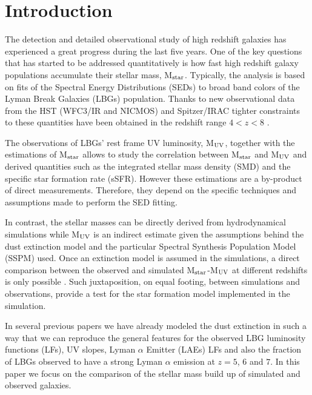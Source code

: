 \documentclass{emulateapj}
\begin{document}
\section{Introduction}



The detection and detailed observational study of high redshift galaxies has
experienced a great progress during the last five years. One of the key
questions that has started to be addressed quantitatively is how fast
high redshift galaxy populations accumulate their stellar mass,
M$_{\rm star}$. Typically, the analysis is based on fits of the  Spectral Energy
Distributions (SEDs) to broad band colors of the Lyman Break Galaxies
(LBGs) population. Thanks to new observational data from the HST (WFC3/IR
and NICMOS) and Spitzer/IRAC tighter constraints to these quantities have been obtained in the
redshift range $4<z<8$ \citep{2009ApJ...697.1493S,2011ApJ...735L..34G}.       

The observations of LBGs' rest frame UV luminosity, M$_{\rm UV}$, together with the estimations of M$_{\rm star}$ allows to study
the correlation between M$_{\rm star}$ and M$_{\rm UV}$ and derived
quantities such as the integrated stellar mass density (SMD) and the
specific star formation rate (sSFR). However these estimations are
a by-product of direct measurements. Therefore, they depend on the specific
techniques and assumptions made to perform the SED fitting. 

In contrast, the stellar masses can be directly derived
from hydrodynamical simulations while M$_{\rm UV}$ is an indirect
estimate given the assumptions behind the dust extinction model and
the particular Spectral Synthesis Population Model (SSPM) used. Once
an extinction model is assumed in the simulations, a direct comparison
between the observed and simulated M$_{\rm   star}$-M$_{\rm UV}$ at
different redshifts is only possible
\citep{2011MNRAS.410.1703F,2012MNRAS.421.2568D}. Such juxtaposition,
on equal footing, between simulations and observations, provide a test
for the star formation model implemented in the simulation.  


In several previous papers
\citep{2010MNRAS.403L..31F,2011MNRAS.415.3666F,2012MNRAS.419..952F} we
have already modeled the dust extinction in such a way that we can
reproduce the general features for the observed LBG luminosity
functions (LFs), UV slopes, Lyman $\alpha$ Emitter (LAEs) LFs and also
the fraction of LBGs observed to have a strong Lyman $\alpha$ emission
at $z=5$, $6$ and $7$.  In this paper we focus on the comparison of
the stellar mass build up of simulated and observed galaxies.
\end{document}
